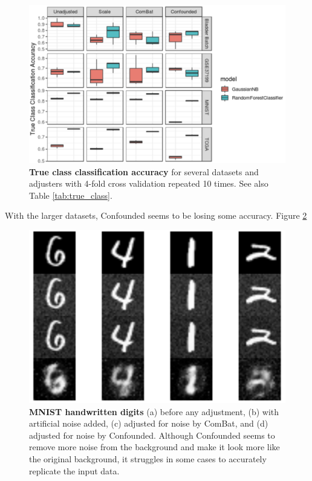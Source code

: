 \documentclass[notitlepage]{article}
\begin{document}
\begin{figure}
	\centering
	\includegraphics[width=4.5in]{figures/rough/true_class_accuracy}
	\caption{\textbf{True class classification accuracy} for several datasets and adjusters with 4-fold cross validation repeated 10 times.
	See also Table \ref{tab:true_class}.}
	\label{fig:true_class}
\end{figure}
\begin{table}
	\centering
	\caption{\textbf{True class classification accuracy} for several datasets and adjusters.
	After adjustment by the ideal batch adjuster, all true class signal should be preserved, and all classifiers should therefore have the same accuracy in predicting true class before and after adjustment.
	See also Figure \ref{fig:true_class}}
	\label{tab:true_class}
\end{table}

With the larger datasets, Confounded seems to be losing some accuracy.
Figure \ref{fig:mnist}

\begin{figure}
	\centering
	\includegraphics[width=4.5in]{figures/rough/mnist}
	\caption{\textbf{MNIST handwritten digits} (a) before any adjustment,
	(b) with artificial noise added,
	(c) adjusted for noise by ComBat, and
	(d) adjusted for noise by Confounded.
	Although Confounded seems to remove more noise from the background and make it look more like the original background, it struggles in some cases to accurately replicate the input data.}
	\label{fig:mnist}
\end{figure}
\end{document}
